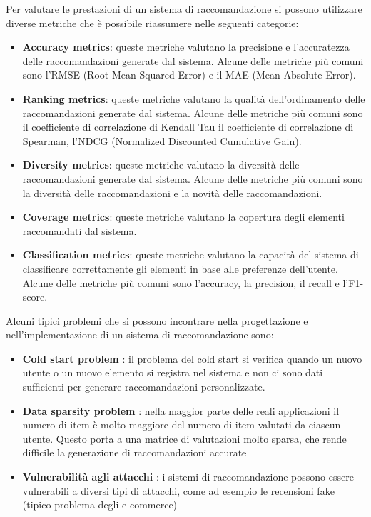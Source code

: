\noindent Per valutare le prestazioni di un sistema di raccomandazione si possono utilizzare diverse metriche che è possibile riassumere nelle seguenti categorie:
\begin{itemize}
    \item \textbf{Accuracy metrics}: queste metriche valutano la precisione e l'accuratezza delle raccomandazioni generate dal sistema. Alcune delle metriche più comuni sono l'RMSE (Root Mean Squared Error) e il MAE (Mean Absolute Error).
    \item \textbf{Ranking metrics}: queste metriche valutano la qualità dell'ordinamento delle raccomandazioni generate dal sistema. Alcune delle metriche più comuni sono il coefficiente di correlazione di Kendall Tau il coefficiente di correlazione di Spearman, l'NDCG (Normalized Discounted Cumulative Gain).
    \item \textbf{Diversity metrics}: queste metriche valutano la diversità delle raccomandazioni generate dal sistema. Alcune delle metriche più comuni sono la diversità delle raccomandazioni e la novità delle raccomandazioni.
    \item \textbf{Coverage metrics}: queste metriche valutano la copertura degli elementi raccomandati dal sistema.
    
    \item \textbf{Classification metrics}: queste metriche valutano la capacità del sistema di classificare correttamente gli elementi in base alle preferenze dell'utente. Alcune delle metriche più comuni sono l'accuracy, la precision, il recall e l'F1-score.
\end{itemize}

\noindent Alcuni tipici problemi che si possono incontrare nella progettazione e nell'implementazione di un sistema di raccomandazione sono:
\begin{itemize}
    \item \textbf{Cold start problem} \cite{ColdStart}: il problema del cold start si verifica quando un nuovo utente o un nuovo elemento si registra nel sistema e non ci sono dati sufficienti per generare raccomandazioni personalizzate.
    \item \textbf{Data sparsity problem} \cite{DataSparsity}: nella maggior parte delle reali applicazioni il numero di item è molto maggiore del numero di item valutati da ciascun utente. Questo porta a una matrice di valutazioni molto sparsa, che rende difficile la generazione di raccomandazioni accurate
    \item \textbf{Vulnerabilità agli attacchi} \cite{Attacchi} : i sistemi di raccomandazione possono essere vulnerabili a diversi tipi di attacchi, come ad esempio le recensioni fake (tipico problema degli e-commerce)
\end{itemize}


